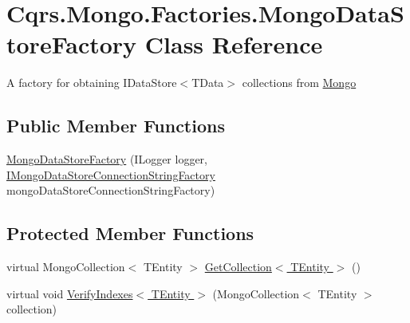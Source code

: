 \hypertarget{classCqrs_1_1Mongo_1_1Factories_1_1MongoDataStoreFactory}{}\section{Cqrs.\+Mongo.\+Factories.\+Mongo\+Data\+Store\+Factory Class Reference}
\label{classCqrs_1_1Mongo_1_1Factories_1_1MongoDataStoreFactory}


A factory for obtaining I\+Data\+Store$<$\+T\+Data$>$ collections from \hyperlink{namespaceCqrs_1_1Mongo}{Mongo}  


\subsection*{Public Member Functions}
\begin{DoxyCompactItemize}
\item 
\hyperlink{classCqrs_1_1Mongo_1_1Factories_1_1MongoDataStoreFactory_a13e1957d50ef5ebb18723a3628a0ae5d_a13e1957d50ef5ebb18723a3628a0ae5d}{Mongo\+Data\+Store\+Factory} (I\+Logger logger, \hyperlink{interfaceCqrs_1_1Mongo_1_1Factories_1_1IMongoDataStoreConnectionStringFactory}{I\+Mongo\+Data\+Store\+Connection\+String\+Factory} mongo\+Data\+Store\+Connection\+String\+Factory)
\end{DoxyCompactItemize}
\subsection*{Protected Member Functions}
\begin{DoxyCompactItemize}
\item 
virtual Mongo\+Collection$<$ T\+Entity $>$ \hyperlink{classCqrs_1_1Mongo_1_1Factories_1_1MongoDataStoreFactory_a4785651135b3a214a855b4d1f7700836_a4785651135b3a214a855b4d1f7700836}{Get\+Collection$<$ T\+Entity $>$} ()
\item 
virtual void \hyperlink{classCqrs_1_1Mongo_1_1Factories_1_1MongoDataStoreFactory_af7db637db99701003e3d8f73a83a3485_af7db637db99701003e3d8f73a83a3485}{Verify\+Indexes$<$ T\+Entity $>$} (Mongo\+Collection$<$ T\+Entity $>$ collection)
\end{DoxyCompactItemize}
